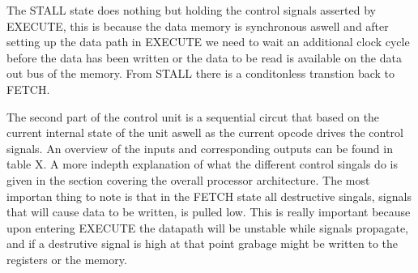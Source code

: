 The STALL state does nothing but holding the control signals asserted by EXECUTE, this is because the data memory is synchronous aswell and after setting up the data path in EXECUTE we need to wait an additional clock cycle before the data has been written or the data to be read is available on the data out bus of the memory. From STALL there is a conditonless transtion back to FETCH.

The second part of the control unit is a sequential circut that based on the current internal state of the unit aswell as the current opcode drives the control signals. An overview of the inputs and corresponding outputs can be found in table X. A more indepth explanation of what the different control singals do is given in the section covering the overall processor architecture. The most importan thing to note is that in the FETCH state all destructive singals, signals that will cause data to be written, is pulled low. This is really important because upon entering EXECUTE the datapath will be unstable while signals propagate, and if a destrutive signal is high at that point grabage might be written to the registers or the memory.
